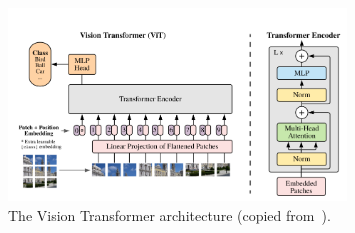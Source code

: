 \begin{figure}
    \centering
    \includegraphics[width=0.8\textwidth]{images/vit_overview.png}
    \caption[The Vision Transformer architecture]{The Vision Transformer architecture (copied from~\cite{Dosovitskiy2020}).}\label{fig:vit}
\end{figure}

